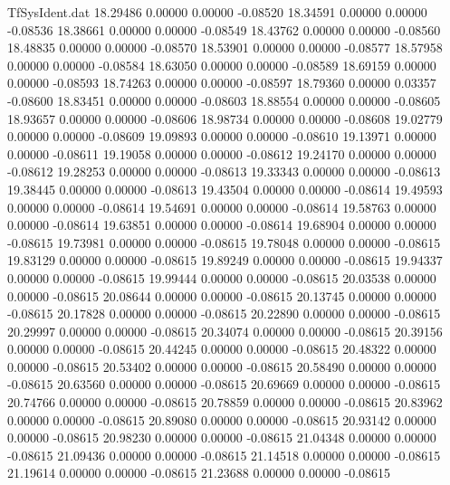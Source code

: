 \begin{filecontents}{TfSysIdent.dat}
  18.29486    0.00000    0.00000   -0.08520
  18.34591    0.00000    0.00000   -0.08536
  18.38661    0.00000    0.00000   -0.08549
  18.43762    0.00000    0.00000   -0.08560
  18.48835    0.00000    0.00000   -0.08570
  18.53901    0.00000    0.00000   -0.08577
  18.57958    0.00000    0.00000   -0.08584
  18.63050    0.00000    0.00000   -0.08589
  18.69159    0.00000    0.00000   -0.08593
  18.74263    0.00000    0.00000   -0.08597
  18.79360    0.00000    0.03357   -0.08600
  18.83451    0.00000    0.00000   -0.08603
  18.88554    0.00000    0.00000   -0.08605
  18.93657    0.00000    0.00000   -0.08606
  18.98734    0.00000    0.00000   -0.08608
  19.02779    0.00000    0.00000   -0.08609
  19.09893    0.00000    0.00000   -0.08610
  19.13971    0.00000    0.00000   -0.08611
  19.19058    0.00000    0.00000   -0.08612
  19.24170    0.00000    0.00000   -0.08612
  19.28253    0.00000    0.00000   -0.08613
  19.33343    0.00000    0.00000   -0.08613
  19.38445    0.00000    0.00000   -0.08613
  19.43504    0.00000    0.00000   -0.08614
  19.49593    0.00000    0.00000   -0.08614
  19.54691    0.00000    0.00000   -0.08614
  19.58763    0.00000    0.00000   -0.08614
  19.63851    0.00000    0.00000   -0.08614
  19.68904    0.00000    0.00000   -0.08615
  19.73981    0.00000    0.00000   -0.08615
  19.78048    0.00000    0.00000   -0.08615
  19.83129    0.00000    0.00000   -0.08615
  19.89249    0.00000    0.00000   -0.08615
  19.94337    0.00000    0.00000   -0.08615
  19.99444    0.00000    0.00000   -0.08615
  20.03538    0.00000    0.00000   -0.08615
  20.08644    0.00000    0.00000   -0.08615
  20.13745    0.00000    0.00000   -0.08615
  20.17828    0.00000    0.00000   -0.08615
  20.22890    0.00000    0.00000   -0.08615
  20.29997    0.00000    0.00000   -0.08615
  20.34074    0.00000    0.00000   -0.08615
  20.39156    0.00000    0.00000   -0.08615
  20.44245    0.00000    0.00000   -0.08615
  20.48322    0.00000    0.00000   -0.08615
  20.53402    0.00000    0.00000   -0.08615
  20.58490    0.00000    0.00000   -0.08615
  20.63560    0.00000    0.00000   -0.08615
  20.69669    0.00000    0.00000   -0.08615
  20.74766    0.00000    0.00000   -0.08615
  20.78859    0.00000    0.00000   -0.08615
  20.83962    0.00000    0.00000   -0.08615
  20.89080    0.00000    0.00000   -0.08615
  20.93142    0.00000    0.00000   -0.08615
  20.98230    0.00000    0.00000   -0.08615
  21.04348    0.00000    0.00000   -0.08615
  21.09436    0.00000    0.00000   -0.08615
  21.14518    0.00000    0.00000   -0.08615
  21.19614    0.00000    0.00000   -0.08615
  21.23688    0.00000    0.00000   -0.08615

\end{filecontents}
